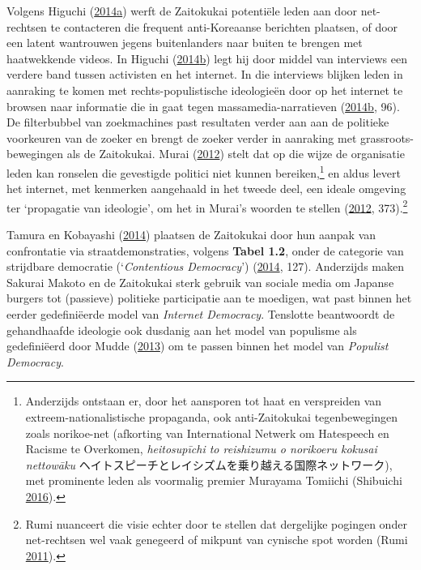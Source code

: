 \documentclass[10.5pt,dutch,]{article}
\begin{document}
Volgens Higuchi
(\protect\hyperlink{ref-higuchiux5fjapansux5f2014}{2014}\protect\hyperlink{ref-higuchiux5fjapansux5f2014}{a})
werft de Zaitokukai potentiële leden aan door net-rechtsen te
contacteren die frequent anti-Koreaanse berichten plaatsen, of door een
latent wantrouwen jegens buitenlanders naar buiten te brengen met
haatwekkende videos. In Higuchi
(\protect\hyperlink{ref-higuchiux5fned:ux5f2014}{2014}\protect\hyperlink{ref-higuchiux5fned:ux5f2014}{b})
legt hij door middel van interviews een verdere band tussen activisten
en het internet. In die interviews blijken leden in aanraking te komen
met rechts-populistische ideologieën door op het internet te browsen
naar informatie die in gaat tegen massamedia-narratieven
(\protect\hyperlink{ref-higuchiux5fned:ux5f2014}{2014}\protect\hyperlink{ref-higuchiux5fned:ux5f2014}{b},
96). De filterbubbel van zoekmachines past resultaten verder aan aan de
politieke voorkeuren van de zoeker en brengt de zoeker verder in
aanraking met grassroots-bewegingen als de Zaitokukai. Murai
(\protect\hyperlink{ref-muraiux5fnetux5f2012}{2012}) stelt dat op die
wijze de organisatie leden kan ronselen die gevestigde politici niet
kunnen bereiken,\footnote{Anderzijds ontstaan er, door het aansporen tot
  haat en verspreiden van extreem-nationalistische propaganda, ook
  anti-Zaitokukai tegenbewegingen zoals norikoe-net (afkorting van
  International Netwerk om Hatespeech en Racisme te Overkomen,
  \emph{heitosupīchi to reishizumu o norikoeru kokusai nettowāku}
  ヘイトスピーチとレイシズムを乗り越える国際ネットワーク), met
  prominente leden als voormalig premier Murayama Tomiichi (Shibuichi
  \protect\hyperlink{ref-shibuichiux5fstruggleux5f2016}{2016}).} en
aldus levert het internet, met kenmerken aangehaald in het tweede deel,
een ideale omgeving ter `propagatie van ideologie', om het in Murai's
woorden te stellen (\protect\hyperlink{ref-muraiux5fnetux5f2012}{2012},
373).\footnote{Rumi nuanceert die visie echter door te stellen dat
  dergelijke pogingen onder net-rechtsen wel vaak genegeerd of mikpunt
  van cynische spot worden (Rumi
  \protect\hyperlink{ref-rumiux5fkoreansux5f2011}{2011}).}

Tamura en Kobayashi
(\protect\hyperlink{ref-tamuraux5fnigglingux5f2014}{2014}) plaatsen de
Zaitokukai door hun aanpak van confrontatie via straatdemonstraties,
volgens \textbf{Tabel 1.2}, onder de categorie van strijdbare democratie
(`\emph{Contentious Democracy}')
(\protect\hyperlink{ref-tamuraux5fnigglingux5f2014}{2014}, 127).
Anderzijds maken Sakurai Makoto en de Zaitokukai sterk gebruik van
sociale media om Japanse burgers tot (passieve) politieke participatie
aan te moedigen, wat past binnen het eerder gedefiniëerde model van
\emph{Internet Democracy}. Tenslotte beantwoordt de gehandhaafde
ideologie ook dusdanig aan het model van populisme als gedefiniëerd door
Mudde (\protect\hyperlink{ref-muddeux5foxfordux5f2013}{2013}) om te
passen binnen het model van \emph{Populist Democracy}.
\end{document}
